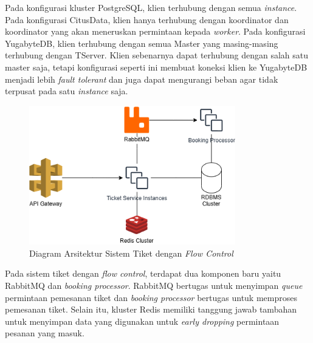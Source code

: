 Pada konfigurasi kluster PostgreSQL, klien terhubung dengan semua \textit{instance}. Pada konfigurasi CitusData, klien hanya terhubung dengan koordinator dan koordinator yang akan meneruskan permintaan kepada \textit{worker}. Pada konfigurasi YugabyteDB, klien terhubung dengan semua Master yang masing-masing terhubung dengan TServer. Klien sebenarnya dapat terhubung dengan salah satu master saja, tetapi konfigurasi seperti ini membuat koneksi klien ke YugabyteDB menjadi lebih \textit{fault tolerant} dan juga dapat mengurangi beban agar tidak terpusat pada satu \textit{instance} saja.

\begin{figure}[htbp]
    \centering
    \includegraphics[width=0.8\textwidth]{resources/chapter-3/ticket-fc.png}
    \caption{Diagram Arsitektur Sistem Tiket dengan \textit{Flow Control}}
    \label{fig:ticket-fc}
\end{figure}

Pada sistem tiket dengan \textit{flow control}, terdapat dua komponen baru yaitu RabbitMQ dan \textit{booking processor}. RabbitMQ bertugas untuk menyimpan \textit{queue} permintaan pemesanan tiket dan \textit{booking processor} bertugas untuk memproses pemesanan tiket. Selain itu, kluster Redis memiliki tanggung jawab tambahan untuk menyimpan data yang digunakan untuk \textit{early dropping} permintaan pesanan yang masuk.